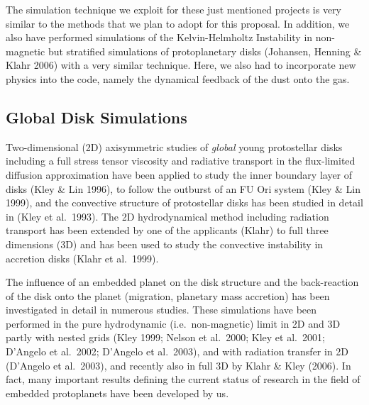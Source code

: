 The simulation technique we exploit for these just mentioned projects is
very similar to the methods that we plan to adopt for this proposal.  In
addition, we also have performed simulations of the Kelvin-Helmholtz
Instability in non-magnetic but stratified simulations of protoplanetary
disks (Johansen, Henning \& Klahr 2006) with a very similar
technique. Here, we also had to incorporate new physics into the code,
namely the dynamical feedback of the dust onto the gas.
%
\subsection{Global Disk Simulations}
%
Two-dimensional (2D) axisymmetric studies of {\it global} young protostellar
disks including a full stress tensor viscosity and radiative transport in
the flux-limited diffusion approximation have been applied to study the
inner boundary layer of disks (Kley \& Lin 1996), to follow the outburst of
an FU Ori system (Kley \& Lin 1999), and the convective structure of
protostellar disks has been studied in detail in (Kley et al.\ 1993). The 2D
hydrodynamical method including radiation transport has been extended by one
of the applicants (Klahr) to full three dimensions (3D) and has been used to
study the convective instability in accretion disks (Klahr et al.\ 1999).

The influence of an embedded planet on the disk structure and the
back-reaction of the disk onto the planet (migration, planetary mass
accretion) has been investigated in detail in numerous studies.  These
simulations have been performed in the pure hydrodynamic (i.e.\
non-magnetic) limit in 2D and 3D partly with nested grids (Kley 1999; Nelson
et al.\ 2000; Kley et al.\ 2001; D'Angelo et al.\ 2002; D'Angelo et al.\
2003), and with radiation transfer in 2D (D'Angelo et al.\ 2003), and
recently also in full 3D by Klahr \& Kley (2006).  In fact, many important
results defining the current status of research in the field of embedded
protoplanets have been developed by us.

